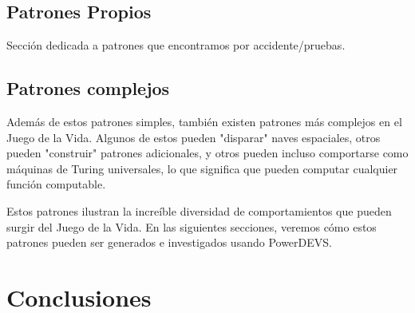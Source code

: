 \documentclass[]{article}
\begin{document}

\subsection{Patrones Propios}
Sección dedicada a patrones que encontramos por accidente/pruebas.

\subsection{Patrones complejos}
Además de estos patrones simples, también existen patrones más complejos en el Juego de la Vida. Algunos de estos pueden "disparar" naves espaciales, otros pueden "construir" patrones adicionales, y otros pueden incluso comportarse como máquinas de Turing universales, lo que significa que pueden computar cualquier función computable.


Estos patrones ilustran la increíble diversidad de comportamientos que pueden surgir del Juego de la Vida. En las siguientes secciones, veremos cómo estos patrones pueden ser generados e investigados usando PowerDEVS.



\section{Conclusiones}
\end{document}

